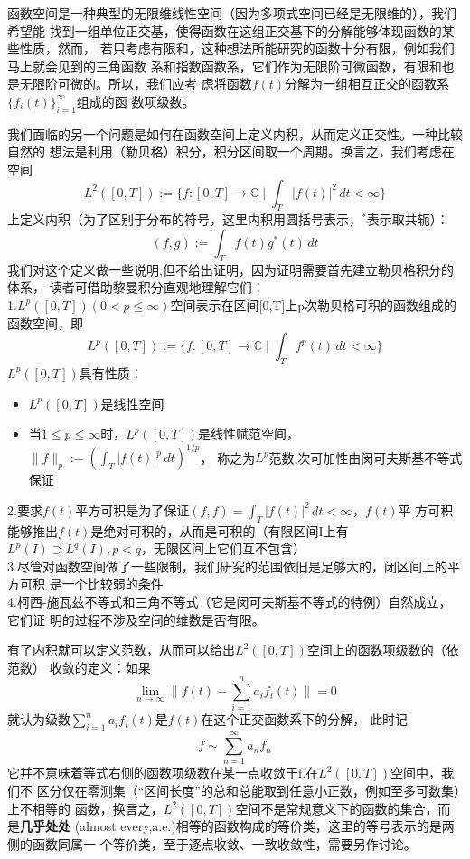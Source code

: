 \documentclass{ctexbook}
\begin{document}
函数空间是一种典型的无限维线性空间（因为多项式空间已经是无限维的），我们希望能
找到一组单位正交基，使得函数在这组正交基下的分解能够体现函数的某些性质，然而，
若只考虑有限和，这种想法所能研究的函数十分有限，例如我们马上就会见到的三角函数
系和指数函数系，它们作为无限阶可微函数，有限和也是无限阶可微的。所以，我们应考
虑将函数$f(t)$分解为一组相互正交的函数系$\{f_i(t)\}_{i=1}^{\infty}$组成的函
数项级数。

我们面临的另一个问题是如何在函数空间上定义内积，从而定义正交性。一种比较自然的
想法是利用（勒贝格）积分，积分区间取一个周期。换言之，我们考虑在空间
\[L^2([0,T]):=\{f:[0,T]\rightarrow \mathbb{C} \mid \int_{T}|f(t)|^2\,dt<\infty\}\]
上定义内积（为了区别于分布的符号，这里内积用圆括号表示，$^*$表示取共轭）：
\[(f,g):=\int_{T}f(t)g^*(t)\,dt \]
我们对这个定义做一些说明,但不给出证明，因为证明需要首先建立勒贝格积分的体系，
读者可借助黎曼积分直观地理解它们：\\
1.$L^p([0,T])(0<p\leq \infty)$空间表示在区间[0,T]上p次勒贝格可积的函数组成的函数空间，即
\[L^p([0,T]):=\{f:[0,T]\rightarrow \mathbb{C} \mid \int_{T}f^p(t)\,dt<\infty\}\]
$L^p([0,T])$具有性质：
\begin{itemize}
    \item \raggedright{} $L^p([0,T])$是线性空间\\
    \item 当$1\leq p \leq \infty$时，$L^p([0,T])$是线性赋范空间，
          $\| f \|_{p} := \left( \int_{T} |f(t)|^p \, dt \right)^{1/p}$，
          称之为$L^p$范数,次可加性由闵可夫斯基不等式保证
\end{itemize}
2.要求$f(t)$平方可积是为了保证$(f,f)=\int_{T}|f(t)|^2\,dt<\infty$，$f(t)$平
方可积能够推出$f(t)$是绝对可积的，从而是可积的（有限区间I上有$L^p(I)\supset  L^q(I),p<q$，无限区间上它们互不包含）\\
3.尽管对函数空间做了一些限制，我们研究的范围依旧是足够大的，闭区间上的平方可积
是一个比较弱的条件\\
4.柯西-施瓦兹不等式和三角不等式（它是闵可夫斯基不等式的特例）自然成立，它们证
明的过程不涉及空间的维数是否有限。

有了内积就可以定义范数，从而可以给出$L^2([0,T])$空间上的函数项级数的（依范数）
收敛的定义：如果
\[\lim_{n \to \infty} \| f(t)-\sum_{i = 1}^{n}  a_i f_i(t)\|=0\]
就认为级数$\sum_{i = 1}^{n}  a_i f_i(t)$是$f(t)$在这个正交函数系下的分解，
此时记\[f\sim\sum_{n=1}^{\infty}a_n f_n\]
它并不意味着等式右侧的函数项级数在某一点收敛于f.在$L^2([0,T])$空间中，我们不
区分仅在零测集（“区间长度”的总和总能取到任意小正数，例如至多可数集）上不相等的
函数，换言之，$L^2([0,T])$空间不是常规意义下的函数的集合，而是\textbf{几乎处处}
(almost every,a.e.)相等的函数构成的等价类，这里的等号表示的是两侧的函数同属一
个等价类，至于逐点收敛、一致收敛性，需要另作讨论。
\end{document}
